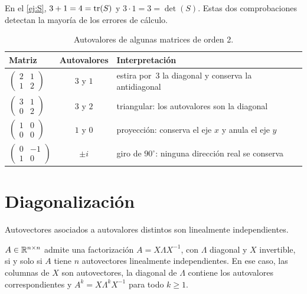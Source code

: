 En el \cref{ej:S}, $3+1=4=\operatorname{tr}(S)$ y $3\cdot 1=3=\det(S)$. Estas dos comprobaciones detectan la mayoría de los errores de cálculo.

\begin{table}[h]
\centering\small
\caption{Autovalores de algunas matrices de orden 2.}\label{tab:autovalores}
\begin{tabular}{@{}lcl@{}}
\toprule
Matriz & Autovalores & Interpretación \\
\midrule
$\begin{pmatrix}2&1\\1&2\end{pmatrix}$ & $3$ y $1$ & estira por~3 la diagonal y conserva la antidiagonal \\[6pt]
$\begin{pmatrix}3&1\\0&2\end{pmatrix}$ & $3$ y $2$ & triangular: los autovalores son la diagonal \\[6pt]
$\begin{pmatrix}1&0\\0&0\end{pmatrix}$ & $1$ y $0$ & proyección: conserva el eje $x$ y anula el eje $y$ \\[6pt]
$\begin{pmatrix}0&-1\\1&0\end{pmatrix}$ & $\pm i$ & giro de $90^{\circ}$: ninguna dirección real se conserva \\
\bottomrule
\end{tabular}
\end{table}

\section{Diagonalización}

\begin{proposicion}\label{prop:indep-autovectores}
Autovectores asociados a autovalores distintos son linealmente independientes.
\end{proposicion}

\begin{teorema}[Diagonalización]\label{teo:diagonalizacion}
$A\in\mathbb{R}^{n\times n}$ admite una factorización $A=X\Lambda X^{-1}$, con $\Lambda$ diagonal y $X$ invertible, si y solo si $A$ tiene $n$ autovectores linealmente independientes. En ese caso, las columnas de $X$ son autovectores, la diagonal de $\Lambda$ contiene los autovalores correspondientes y $A^{k}=X\Lambda^{k}X^{-1}$ para todo $k\ge 1$.
\end{teorema}

